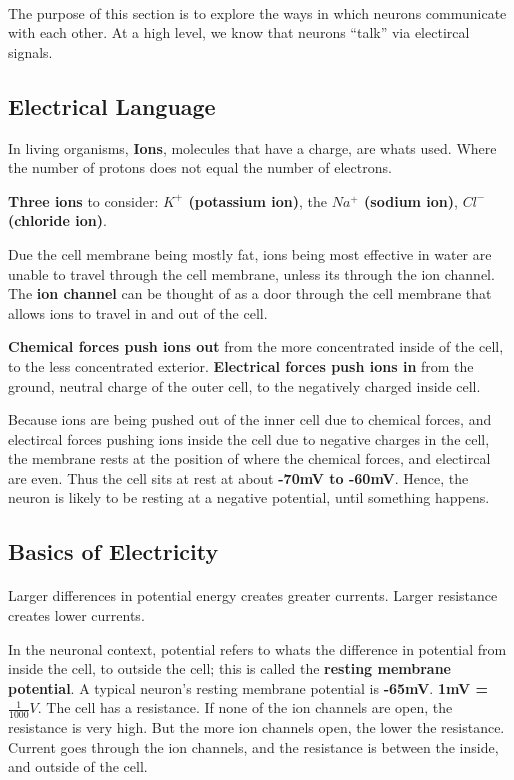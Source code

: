 \documentclass[12pt, a4paper]{article}
\begin{document}
\paragraph*{}
The purpose of this section is to explore the ways in which neurons communicate with each other.
At a high level, we know that neurons ``talk'' via electircal signals.

\subsection{Electrical Language}
In living organisms, \textbf{Ions}, molecules that have a charge, are whats used. Where 
the number of protons does not equal the number of electrons.

\textbf{Three ions} to consider: \textbf{$K^+$ (potassium ion)}, the \textbf{$Na^+$ (sodium ion)},
\textbf{$Cl^-$ (chloride ion)}.

Due the cell membrane being mostly fat, ions being most effective in water
are unable to travel through the cell membrane, unless its through the ion channel.
The \textbf{ion channel} can be thought of as a door through the cell membrane that allows
ions to travel in and out of the cell.

\textbf{Chemical forces push ions out} from the more concentrated inside of the cell,
to the less concentrated exterior.
\textbf{Electrical forces push ions in} from the ground, neutral charge of the outer cell,
to the negatively charged inside cell.

Because ions are being pushed out of the inner cell due to chemical forces,
and electircal forces pushing ions inside the cell due to negative charges in the cell,
the membrane rests at the position of where the chemical forces, and electircal are even.
Thus the cell sits at rest at about \textbf{-70mV to -60mV}. Hence, the neuron
is likely to be resting at a negative potential, until something happens.


\subsection{Basics of Electricity}
\paragraph*{}
Larger differences in potential energy creates greater currents. Larger resistance
creates lower currents.

In the neuronal context, potential refers to whats the difference in potential from inside the cell,
to outside the cell; this is called the \textbf{resting membrane potential}. A
typical neuron's resting membrane potential is \textbf{-65mV}.
\textbf{1mV = $\frac{1}{1000}V$}. The cell has a resistance. If none of the ion channels are open,
the resistance is very high. But the more ion channels open, the lower the resistance.
Current goes through the ion channels, and the resistance is between the inside, and outside of the cell.
\end{document}
